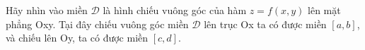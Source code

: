 \documentclass[preview]{standalone}
\begin{document}
\parbox{6cm}{Hãy nhìn vào miền $\mathcal{D}$ là hình chiếu vuông góc của hàm $z = f(x, y)$ lên mặt phẳng Oxy. Tại đây chiếu vuông góc miền $\mathcal{D}$ lên trục Ox ta có được miền $[a, b]$, và chiếu lên Oy, ta có được miền $[c, d]$.}
\end{document}
